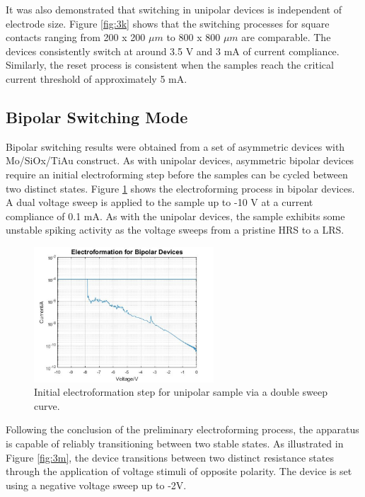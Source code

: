 \noindent It was also demonstrated that switching in unipolar devices is independent of electrode size. Figure \ref{fig:3k} shows that the switching processes for square contacts ranging from 200 x 200 $\mu m$ to 800 x 800 $\mu m$ are comparable. The devices consistently switch at around 3.5 V and 3 mA of current compliance. Similarly, the reset process is consistent when the samples reach the critical current threshold of approximately 5 mA.

\subsection[Bipolar Switching Mode]{Bipolar Switching Mode}

\noindent  Bipolar switching results were obtained from a set of asymmetric devices with Mo/SiOx/TiAu construct. As with unipolar devices, asymmetric bipolar devices require an initial electroforming step before the samples can be cycled between two distinct states. Figure \ref{fig:3l} shows the electroforming process in bipolar devices. A dual voltage sweep is applied to the sample up to -10 V at a current compliance of 0.1 mA. As with the unipolar devices, the sample exhibits some unstable spiking activity as the voltage sweeps from a pristine HRS to a LRS.\\


\begin{figure}[htbp!] 
    \centering    
    \includegraphics[width=0.6\textwidth]{Chapter3/Figs/l.png}
    \caption[Initial electroformation step for unipolar sample via a double sweep curve.]{Initial electroformation step for unipolar sample via a double sweep curve.}
    \label{fig:3l}
\end{figure}


\noindent Following the conclusion of the preliminary electroforming process, the apparatus is capable of reliably transitioning between two stable states. As illustrated in Figure \ref{fig:3m}, the device transitions between two distinct resistance states through the application of voltage stimuli of opposite polarity. The device is set using a negative voltage sweep up to -2V. \\


